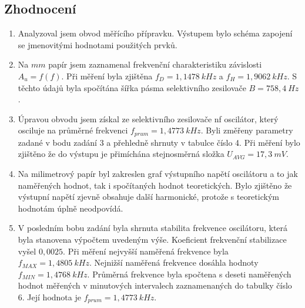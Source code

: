   \subsection*{Zhodnocení}
    \begin{enumerate}
      \item
        Analyzoval jsem obvod měřícího přípravku. Výstupem bylo schéma zapojení se jmenovitými hodnotami použitých prvků.
      \item
        Na $mm$ papír jsem zaznamenal frekvenční charakteristiku závislosti $A_u = f(f)$. Při měření byla zjištěna $f_D = 1,1478~kHz$ a $f_H = 1,9062~kHz$. S těchto údajů byla spočítána šířka pásma selektivního zesilovače $B = 758,4~Hz$.
      \item
      	Úpravou obvodu jsem získal ze selektivního zesilovače nf oscilátor, který osciluje na průměrné frekvenci $f_{prum} = 1,4773~kHz$. Byli změřeny parametry zadané v bodu zadání 3 a přehledně shrnuty v tabulce číslo 4. Při měření bylo zjištěno že do výstupu je přimíchána stejnosměrná složka $U_{AVG} = 17,3~mV$.
      \item
        Na milimetrový papír byl zakreslen graf výstupního napětí oscilátoru a to jak naměřených hodnot, tak i spočítaných hodnot teoretických. Bylo zjištěno že výstupní napětí zjevně obsahuje další harmonické, protože s teoretickým hodnotám úplně neodpovídá.
      \item
      	V posledním bobu zadání byla shrnuta stabilita frekvence oscilátoru, která byla stanovena výpočtem uvedeným výše. Koeficient frekvenční stabilizace vyšel $0,0025$. Při měření nejvyšší naměřená frekvence byla $f_{MAX} = 1,4805~kHz$. Nejnižší naměřená frekvence dosáhla hodnoty $f_{MIN} =  1,4768~kHz$. Průměrná frekvence byla spočtena s deseti naměřených hodnot měřených v minutových intervalech zaznamenaných do tabulky číslo 6. Její hodnota je $f_{prum} =  1,4773~kHz$.
  \end{enumerate}
